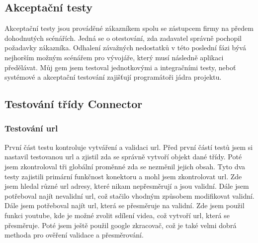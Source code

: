 \subsection{Akceptační testy}
\par Akceptační testy jsou prováděné zákazníkem spolu se zástupcem firmy na předem dohodnutých scénářích. Jedná se o otestování, zda zadavatel správně pochopil požadavky zákazníka. Odhalení závažných nedostatků v této poslední fázi bývá nejhorším možným scénářem pro vývojáře, který musí následně aplikaci předělávat. Můj gem jsem testoval jednotkovými a integračními testy, neboť systémové a akceptační testování zajišťují programátoři jádra projektu.


\subsection{Testování třídy Connector}
\subsubsection{Testování url}
\par První část testu kontroluje vytváření a validaci url. Před první částí testů jsem si nastavil testovanou url a zjistil zda se správně vytvoří objekt dané třídy. Poté jsem zkontroloval tři globální proměnné zda se nezměnil jejich obsah. Tyto dva testy zajistili primární funkčnost konektoru a mohl jsem zkontrolovat url. Zde jsem hledal různé url adresy, které nikam nepřesměrují a jsou validní. Dále jsem potřeboval najít nevalidní url, což stačilo vhodným způsobem modifikovat validní. Dále jsem potřeboval najít url, která se přesměruje na validní. Zde jsem použil funkci youtube, kde je možné zvolit sdílení videa, což vytvoří url, která se přesměruje. Poté jsem ještě použil google zkracovač, což je také velmi dobrá methoda pro ověření validace a přesměrování.
